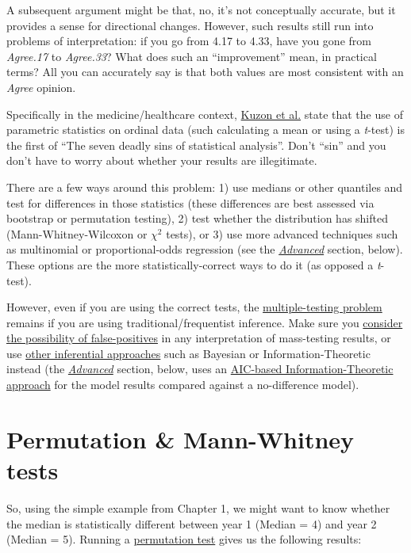 \documentclass[]{book}
\begin{document}
A subsequent argument might be that, no, it's not conceptually accurate,
but it provides a sense for directional changes. However, such results
still run into problems of interpretation: if you go from 4.17 to 4.33,
have you gone from \emph{Agree.17} to \emph{Agree.33}? What does such an
``improvement'' mean, in practical terms? All you can accurately say is
that both values are most consistent with an \emph{Agree} opinion.

Specifically in the medicine/healthcare context,
\href{https://www.ncbi.nlm.nih.gov/pubmed/8883724}{Kuzon et al.} state
that the use of parametric statistics on ordinal data (such calculating
a mean or using a \emph{t}-test) is the first of ``The seven deadly sins
of statistical analysis''. Don't ``sin'' and you don't have to worry
about whether your results are illegitimate.

There are a few ways around this problem: 1) use medians or other
quantiles and test for differences in those statistics (these
differences are best assessed via bootstrap or permutation testing), 2)
test whether the distribution has shifted (Mann-Whitney-Wilcoxon or
\(\chi^2\) tests), or 3) use more advanced techniques such as
multinomial or proportional-odds regression (see the
\protect\hyperlink{Advanced}{\emph{Advanced}} section, below). These
options are the more statistically-correct ways to do it (as opposed a
\emph{t}-test).

However, even if you are using the correct tests, the
\href{https://en.wikipedia.org/wiki/Multiple_comparisons_problem}{multiple-testing
problem} remains if you are using traditional/frequentist inference.
Make sure you \href{http://xkcd.com/882/}{consider the possibility of
false-positives} in any interpretation of mass-testing results, or use
\href{http://labstats.net/articles/overview.html}{other inferential
approaches} such as Bayesian or Information-Theoretic instead (the
\protect\hyperlink{Advanced}{\emph{Advanced}} section, below, uses an
\href{https://en.wikipedia.org/wiki/Akaike_information_criterion}{AIC-based
Information-Theoretic approach} for the model results compared against a
no-difference model).

\section{Permutation \& Mann-Whitney
tests}\label{permutation-mann-whitney-tests}

So, using the simple example from Chapter 1, we might want to know
whether the median is statistically different between year 1 (Median =
4) and year 2 (Median = 5). Running a
\href{https://en.wikipedia.org/wiki/Resampling_(statistics)\#Permutation_tests}{permutation
test} gives us the following results:
\end{document}
